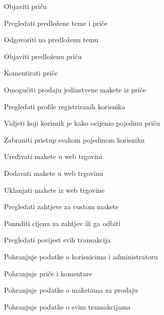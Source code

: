 \begin{packed_enum}
\begin{packed_enum}
				\end{packed_enum}
							\item  {}
			
				\begin{packed_enum}
					
					\item Objaviti priču
					\item Pregledati predložene teme i priče
					\item Odgovoriti na predloženu temu
					\item Objaviti predloženu priču
					\item Komentirati priče
					\item Omogućiti prodaju jedinstvene makete iz priče
					\item Pregledati profile registriranih korisnika
					\item Vidjeti koji korisnik je kako ocijenio pojedinu priču
					\item Zabraniti pristup svakom pojedinom korisniku
					\item Uređivati makete u web trgovini
					\item Dodavati makete u web trgovinu
					\item Uklanjati makete iz web trgovine
					\item Pregledati zahtjeve za custom makete
					\item Ponuditi cijenu za zahtjev ili ga odbiti
					\item Pregledati povijest svih transakcija
					
				\end{packed_enum}
							\item  {}
		
				\begin{packed_enum}
					
					\item Pohranjuje podatke o korisnicima i administratoru
					\item Pohranjuje priče i komentare
					\item Pohranjuje podatke o maketama za prodaju
					\item Pohranjuje podatke o svim transakcijama
					
				\end{packed_enum}
			\end{packed_enum}
			
			\eject 
			
			
				
